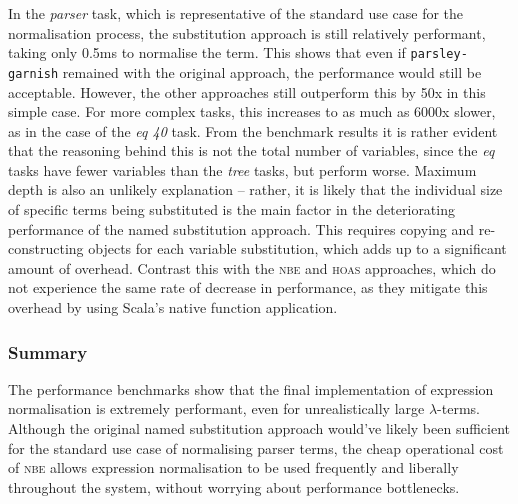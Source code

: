 \documentclass[../../main.tex]{subfiles}
\begin{document}
In the \emph{parser} task, which is representative of the standard use case for the normalisation process, the substitution approach is still relatively performant, taking only 0.5ms to normalise the term.
This shows that even if \texttt{parsley-garnish} remained with the original approach, the performance would still be acceptable.
However, the other approaches still outperform this by 50x in this simple case.
For more complex tasks, this increases to as much as 6000x slower, as in the case of the \emph{eq 40} task.
From the benchmark results it is rather evident that the reasoning behind this is not the total number of variables, since the \emph{eq} tasks have fewer variables than the \emph{tree} tasks, but perform worse.
Maximum depth is also an unlikely explanation -- rather, it is likely that the individual size of specific terms being substituted is the main factor in the deteriorating performance of the named substitution approach.
This requires copying and re-constructing objects for each variable substitution, which adds up to a significant amount of overhead.
Contrast this with the \textsc{nbe} and \textsc{hoas} approaches, which do not experience the same rate of decrease in performance, as they mitigate this overhead by using Scala's native function application.

\subsubsection*{Summary}
The performance benchmarks show that the final implementation of expression normalisation is extremely performant, even for unrealistically large $\lambda$-terms.
Although the original named substitution approach would've likely been sufficient for the standard use case of normalising parser terms, the cheap operational cost of \textsc{nbe} allows expression normalisation to be used frequently and liberally throughout the system, without worrying about performance bottlenecks.
\end{document}
